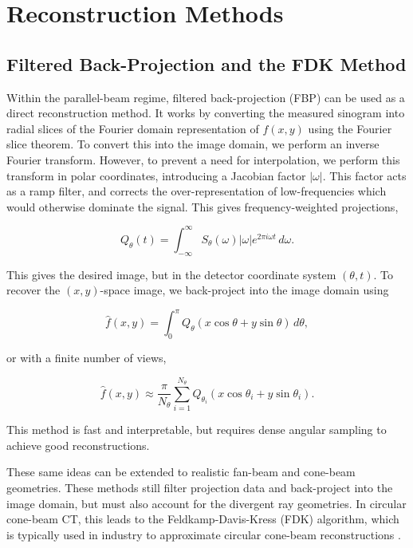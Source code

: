\section{Reconstruction Methods}
\label{sec:reconstruction_methods}

\subsection{Filtered Back-Projection and the FDK Method}
\label{subsec:fbp_fdk}

Within the parallel-beam regime, filtered back-projection (FBP) can be used as a direct reconstruction method. It works by converting the measured sinogram into radial slices of the Fourier domain representation of $f(x,y)$ using the Fourier slice theorem. To convert this into the image domain, we perform an inverse Fourier transform. However, to prevent a need for interpolation, we perform this transform in polar coordinates, introducing a Jacobian factor $|\omega|$. This factor acts as a ramp \cite{ramp} filter, and corrects the over-representation of low-frequencies which would otherwise dominate the signal. This gives frequency-weighted projections, 

\begin{equation}
Q_\theta(t)
=
\int_{-\infty}^{\infty}
S_\theta(\omega)|\omega|e^{2\pi i\omega t}\,d\omega.
\label{eq:filtered_projection}
\end{equation}

This gives the desired image, but in the detector coordinate system $(\theta, t)$. To recover the $(x,y)$-space image, we back-project into the image domain using

\begin{equation}
\hat f(x,y)
=
\int_0^\pi
Q_\theta(x\cos\theta+y\sin\theta)\,d\theta,
\label{eq:fbp_continuous}
\end{equation}

or with a finite number of views, 

\begin{equation}
\hat f(x,y)
\approx
\frac{\pi}{N_\theta}
\sum_{i=1}^{N_\theta}
Q_{\theta_i}(x\cos\theta_i+y\sin\theta_i).
\label{eq:fbp_discrete}
\end{equation}

This method is fast and interpretable, but requires dense angular sampling to achieve good reconstructions.

These same ideas can be extended to realistic fan-beam and cone-beam geometries. These methods still filter projection data and back-project into the image domain, but must also account for the divergent ray geometries. In circular cone-beam CT, this leads to the Feldkamp-Davis-Kress (FDK) algorithm, which is typically used in industry to approximate circular cone-beam reconstructions \cite{}.

